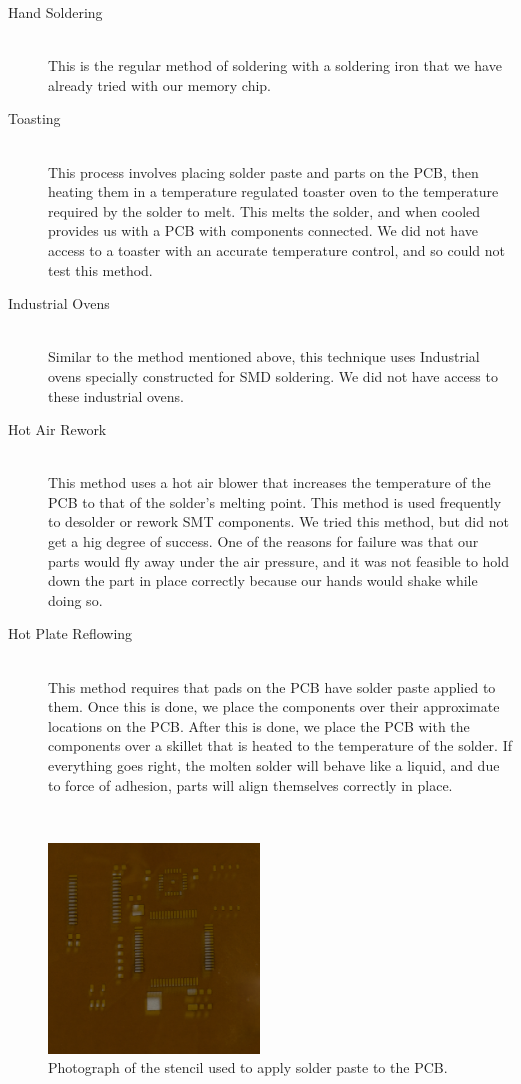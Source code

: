 \begin{description}

	\item[Hand Soldering] \hfill \\
	This is the regular method of soldering with a soldering iron that we have already tried with our memory chip.
	\item[Toasting] \hfill \\
	This process involves placing solder paste and parts on the PCB,
	then heating them in a temperature regulated toaster oven to the temperature required by the solder to melt.
	This melts the solder, and when cooled provides us with a PCB with components connected.
	We did not have access to a toaster with an accurate temperature control,
	and so could not test this method.
	\item[Industrial Ovens] \hfill \\
	Similar to the method mentioned above,
	this technique uses Industrial ovens specially constructed for SMD soldering.
	We did not have access to these industrial ovens.
	\item[Hot Air Rework] \hfill \\
	This method uses a hot air blower that increases the temperature of the PCB to that of the solder's melting point.
	This method is used frequently to desolder or rework SMT components.
	We tried this method,
	but did not get a hig degree of success.
	One of the reasons for failure was that our parts would fly away under the air pressure,
	and it was not feasible to hold down the part in place correctly because our hands would shake while doing so.
	\item[Hot Plate Reflowing] \hfill \\
	This method requires that pads on the PCB have solder paste applied to them.
	Once this is done,
	we place the components over their approximate locations on the PCB.
	After this is done,
	we place the PCB with the components over a skillet that is heated to the temperature of the solder.
	If everything goes right,
	the molten solder will behave like a liquid,
	and due to force of adhesion,
	parts will align themselves correctly in place.
\end{description}
\hfill \\
\begin{figure}
\begin{center}
\includegraphics[width=0.5\textwidth]{images/stencil.jpg}
\caption{Photograph of the stencil used to apply solder paste to the PCB.}
\label{Fig:Stencil}
\end{center}
\end{figure}
